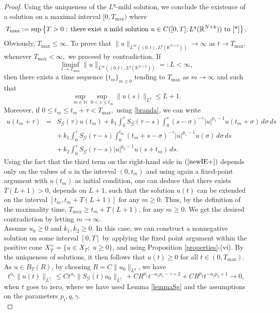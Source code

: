 \documentclass[a4,psfig,english,12pt,epsf,portrait]{article}
\numberwithin{equation}{section}
\def\R{{\mathbb {R}}}
\newcommand{\abs}[1]{\lvert#1\rvert}
\def\R{\mathbb{R}}
\begin{document}
\begin{proof}
	 Using the uniqueness of the $L^q$-mild solution, we conclude the existence
	of a solution on a maximal interval $[0,T_{\max})$ where
	\[
	T_{\max}:=\sup\left\{T>0\;;\;\text{there exist a mild solution $u\in C([0,T];L^q(\R^{N+k}))$
		to \eqref{*}}\right\}.
	\]
	Obviously, $T_{\max}\leq \infty$. To prove that $\|u\|_{L^\infty((0,t),L^q(\mathbb{R}^{N+k}))}\rightarrow\infty$ as $t\rightarrow T_{\max},$
	whenever $T_{\max}<\infty,$ we proceed by contradiction. If
	$$\liminf_{t\rightarrow T_{\max}}\|u\|_{L^\infty((0,t),L^q(\mathbb{R}^{N+k}))}=:L<\infty,$$
	then there exists a time sequence $\{t_m\}_{m\geq0}$ tending to $T_{\max}$ as $m\rightarrow\infty$ and such that
	$$\sup_{m\in\mathbb{N}}\sup_{0<s\leq t_m}\|u(s)\|_{L^q}\leq L+1.$$
	Moreover, if $0\leq t_m\leq t_m+\tau< T_{\max},$ using \eqref{branda}, we can write
	\begin{eqnarray}\label{newIE+}
		u(t_m+\tau)&=&S_{\mathcal{G}}(\tau)u(t_m)+k_1\int_0^\tau S_{\mathcal{G}}(\tau-s)\int_0^s(s-\sigma)^{-\gamma}\abs{u}^{p_1-1}u(t_m+\sigma)\,d\sigma\,ds\nonumber\\
		&& +\,k_1\int_0^\tau S_{\mathcal{G}}(\tau-s)\int_0^{t_m}(t_m+s-\sigma)^{-\gamma}\abs{u}^{p_1-1}u(\sigma)\,d\sigma\,ds\nonumber\\
		&& +\,k_2\int_0^\tau S_{\mathcal{G}}(\tau-s)\abs{u}^{p_2-1}u(s+t_m)\,ds.
	\end{eqnarray}
	Using the fact that the third term on the right-hand side in $(\ref{newIE+})$ depends only on the values of $u$ in the interval
	$(0,t_m)$ and using again a fixed-point argument with $u(t_m)$ as initial condition, one can deduce that there exists $T(L + 1) > 0$, depends on $L+1$, such that the solution
	$u(t)$ can be extended on the interval $[t_m, t_m + T(L + 1)]$ for any $m\geq0$. Thus, by the definition of the maximality time, $T_{\max}\geq t_m+T(L+1)$, for any $m\geq0$. We get the desired contradiction by letting $m\rightarrow\infty$.\\
	
	 Assume $u_0\geq0$ and $k_1,k_2\geq0$.  In this case, we can construct a nonnegative solution on some interval $[0,T]$ by applying the fixed point argument within the positive cone $X_T^+=\{u\in X_T;\;u\geq0\}$, and using Proposition \ref{properties}-(vi). By the uniqueness of solutions, it then follows that $u(t)\geq0$ for all $t\in(0,T_{\max}).$\\
	
	As $u\in B_T(R)$, by choosing $R=C\|u_0\|_{L^{q}}$, we have
	\begin{equation*}
		t^{\alpha_i} \|u(t)\|_{L^{r_i}} \leq  Ct^{\alpha_i}  \|S_\mathcal{G}(t)u_0\|_{L^{r_i}} + C R^{p_1}   t^{-\alpha_1 p_1-\gamma+2} + C R^{p_2}  t^{-\alpha_2 p_2+1}  \longrightarrow0,
	\end{equation*}
	when $t$ goes to zero, where we have used Lemma \ref{lemmaSg} and  the assumptions on the parameters $p_i,q,\gamma$.\\
	

\end{proof}
\end{document}
